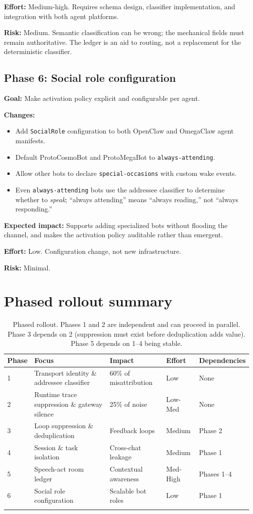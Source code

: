 \documentclass[11pt]{article}
\begin{document}
\textbf{Effort:} Medium-high.  Requires schema design, classifier
implementation, and integration with both agent platforms.

\textbf{Risk:} Medium.  Semantic classification can be wrong; the mechanical
fields must remain authoritative.  The ledger is an aid to routing, not a
replacement for the deterministic classifier.

\subsection{Phase 6: Social role configuration}

\textbf{Goal:} Make activation policy explicit and configurable per agent.

\textbf{Changes:}
\begin{itemize}
\item Add \texttt{SocialRole} configuration to both OpenClaw and OmegaClaw
agent manifests.
\item Default ProtoCosmoBot and ProtoMegaBot to
\texttt{always-attending}.
\item Allow other bots to declare \texttt{special-occasions} with custom
wake events.
\item Even \texttt{always-attending} bots use the addressee classifier to
determine whether to \emph{speak}; ``always attending'' means ``always
reading,'' not ``always responding.''
\end{itemize}

\textbf{Expected impact:} Supports adding specialized bots without flooding
the channel, and makes the activation policy auditable rather than emergent.

\textbf{Effort:} Low.  Configuration change, not new infrastructure.

\textbf{Risk:} Minimal.

\section{Phased rollout summary}

\begin{longtable}{lllll}
\toprule
Phase & Focus & Impact & Effort & Dependencies \\
\midrule
1 & Transport identity \& addressee classifier & 60\% of misattribution & Low & None \\
2 & Runtime trace suppression \& gateway silence & 25\% of noise & Low-Med & None \\
3 & Loop suppression \& deduplication & Feedback loops & Medium & Phase 2 \\
4 & Session \& task isolation & Cross-chat leakage & Medium & Phase 1 \\
5 & Speech-act room ledger & Contextual awareness & Med-High & Phases 1--4 \\
6 & Social role configuration & Scalable bot roles & Low & Phase 1 \\
\bottomrule
\caption{Phased rollout.  Phases 1 and 2 are independent and can proceed in
parallel.  Phase 3 depends on 2 (suppression must exist before deduplication
adds value).  Phase 5 depends on 1--4 being stable.}
\end{longtable}
\end{document}
